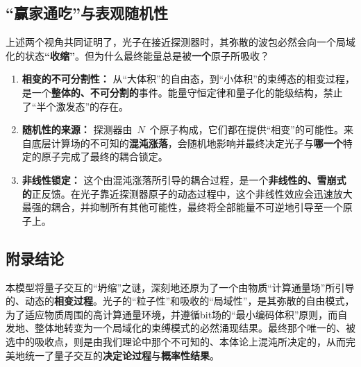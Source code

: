 \documentclass[12pt]{article}
\begin{document}
\subsection{``赢家通吃''与表观随机性}

上述两个视角共同证明了，光子在接近探测器时，其弥散的波包必然会向一个局域化的状态\textbf{``收缩''}。但为什么最终能量总是被\textbf{一个}原子所吸收？

\begin{enumerate}
    \item \textbf{相变的不可分割性：} 从``大体积''的自由态，到``小体积''的束缚态的相变过程，是一个\textbf{整体的、不可分割的}事件。能量守恒定律和量子化的能级结构，禁止了``半个激发态''的存在。
    \item \textbf{随机性的来源：} 探测器由~$N$~个原子构成，它们都在提供``相变''的可能性。来自底层计算场的不可知的\textbf{混沌涨落}，会随机地影响并最终决定光子与\textbf{哪一个}特定的原子完成了最终的耦合锁定。
    \item \textbf{非线性锁定：} 这个由混沌涨落所引导的耦合过程，是一个\textbf{非线性的、雪崩式的}正反馈。在光子靠近探测器原子的动态过程中，这个非线性效应会迅速放大最强的耦合，并抑制所有其他可能性，最终将全部能量不可逆地引导至一个原子上。
\end{enumerate}

\subsection*{附录结论}

本模型将量子交互的``坍缩''之谜，深刻地还原为了一个由物质``计算通量场''所引导的、动态的\textbf{相变过程}。光子的``粒子性''和吸收的``局域性''，是其弥散的自由模式，为了适应物质周围的高计算通量环境，并遵循bit场的``最小编码体积''原则，而自发地、整体地转变为一个局域化的束缚模式的必然涌现结果。最终那个唯一的、被选中的吸收点，则是由我们理论中那个不可知的、本体论上混沌所决定的，从而完美地统一了量子交互的\textbf{决定论过程}与\textbf{概率性结果}。
\end{document}
